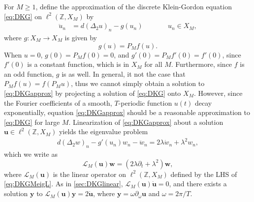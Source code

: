 \documentclass[12pt,reqno]{amsart}
\def\Z{{\mathbb Z}}
\def\calL{\mathcal{L}}
\newcommand{\uvec}{\mathbf{u}}
\newcommand{\wvec}{\mathbf{w}}
\newcommand{\yvec}{\mathbf{y}}
\theoremstyle{definition}
\begin{document}
For $M \geq 1$, define the approximation of the discrete Klein-Gordon equation \cref{eq:DKG} on $\ell^2(\Z, X_M)$ by
\begin{equation}\label{eq:DKGapprox}
\begin{aligned}
\ddot{u}_n &= d (\Delta_2 u)_n - g(u_n) && \qquad u_n \in X_M,
\end{aligned}
\end{equation}
where $g: X_M \rightarrow X_M$ is given by 
\begin{equation}g(u) = P_M f(u).
\end{equation} 
When $u = 0$, $g(0) = P_M f(0) = 0$, and $g'(0) = P_M f'(0) = f'(0)$, since $f'(0)$ is a constant function, which is in $X_M$ for all $M$.
Furthermore, since $f$ is an odd function, $g$ is as well. In general, it not the case that $P_M f(u) = f(P_M u)$, thus we cannot simply obtain a solution to \cref{eq:DKGapprox} by projecting a solution of \cref{eq:DKG} onto $X_M$. However, since the Fourier coefficients of a smooth, $T$-periodic function $u(t)$ decay exponentially, equation \cref{eq:DKGapprox} should be a reasonable approximation to \cref{eq:DKG} for large $M$. Linearization of \cref{eq:DKGapprox} about a solution $\uvec \in \ell^2(\Z, X_M)$ yields the eigenvalue problem
\begin{equation}\label{eq:DKGMeig}
\begin{aligned}
d (\Delta_2 w)_n - g'(u_n)w_n - \ddot{w}_n = 2 \lambda \dot{w}_n + \lambda^2 w_n,
\end{aligned}
\end{equation}
which we write as
\begin{equation}\label{eq:DKGMeigL}
\calL_M(\uvec)\wvec = (2 \lambda \partial_t + \lambda^2 )\wvec,
\end{equation} 
where $\calL_M(\uvec)$ is the linear operator on $\ell^2(\Z, X_M)$ defined by the LHS of \cref{eq:DKGMeigL}. As in \cref{sec:DKGlinear}, $\calL_M(\uvec) \dot{\uvec} = 0$, and there exists a solution $\yvec$ to $\calL_M(\uvec) \yvec = 2 \ddot{\uvec}$, where $\yvec = \omega \partial_\omega \uvec$ and $\omega = 2 \pi / T$.
\end{document}
